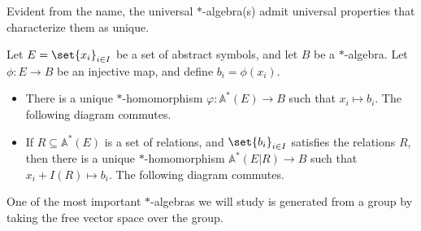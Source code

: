Evident from the name, the universal $\ast$-algebra(s) admit universal properties that characterize them as unique.
\begin{theorem}
  Let $E = \set{x_i}_{i\in I}$ be a set of abstract symbols, and let $B$ be a $\ast$-algebra. Let $\phi\colon E\rightarrow B$ be an injective map, and define $b_i = \phi\left(x_i\right)$.
  \begin{itemize}
    \item There is a unique $\ast$-homomorphism $\varphi\colon \mathbb{A}^{\ast}\left(E\right) \rightarrow B$ such that $x_i \mapsto b_i$. The following diagram commutes.
      \begin{center}
      \end{center}
    \item If $R\subseteq \mathbb{A}^{\ast}\left(E\right)$ is a set of relations, and $\set{b_i}_{i\in I}$ satisfies the relations $R$, then there is a unique $\ast$-homomorphism $\mathbb{A}^{\ast}\left(E|R\right) \rightarrow B$ such that $x_i + I(R) \mapsto b_i$. The following diagram commutes.
      \begin{center}
      \end{center}
  \end{itemize}
\end{theorem}
One of the most important $\ast$-algebras we will study is generated from a group by taking the free vector space over the group.
